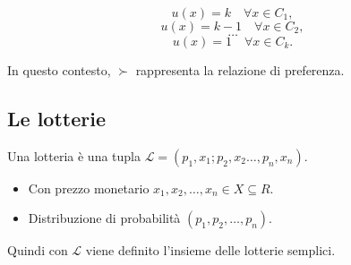 \[
    u(x) = k \quad \forall x \in C_1,
\]
\[
    u(x) = k-1 \quad \forall x \in C_2,
\]
\[
    \ldots
\]
\[
    u(x) = 1 \quad \forall x \in C_k.
\]

In questo contesto, $\succ$ rappresenta la relazione di preferenza.

\subsection{Le lotterie}

Una lotteria è una tupla $\mathcal{L} = (p_1,x_1;p_2,x_2 \ldots, p_n,x_n)$.

\begin{itemize}
    \item Con prezzo monetario $x_1,x_2, \dots, x_n \in X \subseteq R$.
    \item Distribuzione di probabilità $(p_1, p_2, \dots, p_n)$.
\end{itemize}

Quindi con $\mathcal{L}$ viene definito l'insieme delle lotterie semplici.